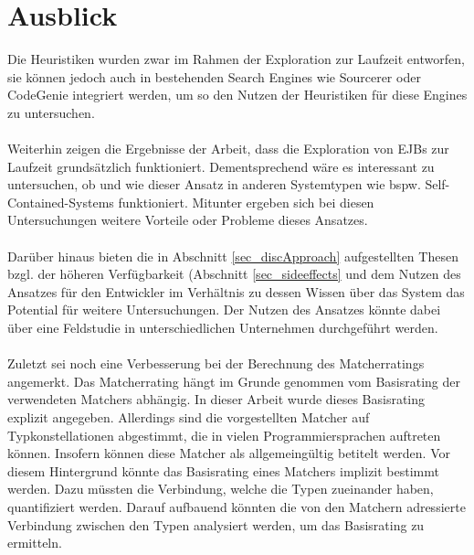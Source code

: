 \section{Ausblick}

Die Heuristiken wurden zwar im Rahmen der Exploration zur Laufzeit entworfen, sie können jedoch auch in bestehenden Search Engines wie Sourcerer oder CodeGenie integriert werden, um so den Nutzen der Heuristiken für diese Engines zu untersuchen.
\\\\
Weiterhin zeigen die Ergebnisse der Arbeit, dass die Exploration von EJBs zur Laufzeit grundsätzlich funktioniert. Dementsprechend wäre es interessant zu untersuchen, ob und wie dieser Ansatz in anderen Systemtypen wie bspw. Self-Contained-Systems funktioniert. Mitunter ergeben sich bei diesen Untersuchungen weitere Vorteile oder Probleme dieses Ansatzes.
\\\\
Darüber hinaus bieten die in Abschnitt \ref{sec_discApproach} aufgestellten Thesen bzgl. der höheren Verfügbarkeit (Abschnitt \ref{sec_sideeffects} und dem Nutzen des Ansatzes für den Entwickler im Verhältnis zu dessen Wissen über das System das Potential für weitere Untersuchungen. Der Nutzen des Ansatzes könnte dabei über eine Feldstudie in unterschiedlichen Unternehmen durchgeführt werden.
\\\\
Zuletzt sei noch eine Verbesserung bei der Berechnung des Matcherratings angemerkt. Das Matcherrating hängt im Grunde genommen vom Basisrating der verwendeten Matchers abhängig. In dieser Arbeit wurde dieses Basisrating explizit angegeben. Allerdings sind die vorgestellten Matcher auf Typkonstellationen abgestimmt, die in vielen Programmiersprachen auftreten können. Insofern können diese Matcher als allgemeingültig betitelt werden. Vor diesem Hintergrund könnte das Basisrating eines Matchers implizit bestimmt werden. Dazu müssten die Verbindung, welche die Typen zueinander haben, quantifiziert werden. Darauf aufbauend könnten die von den Matchern adressierte Verbindung zwischen den Typen analysiert werden, um das Basisrating zu ermitteln.